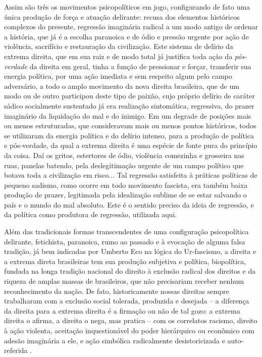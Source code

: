 Assim são três os movimentos psicopolíticos em jogo, configurando de
fato uma única produção de força e atuação delirante: recusa dos
elementos históricos complexos do presente, regressão imaginária radical
a um modo antigo de ordenar a história, que já é a escolha paranoica e
de ódio e pressão urgente por ação de violência, sacrifício e
restauração da civilização. Este sistema de delírio da extrema direita,
que em sua raiz e de modo total já justifica toda ação da
\emph{pós-verdade} da direita em geral, tinha a função de pressionar e
forçar, transferir sua energia política, por uma ação imediata e sem
respeito algum pelo campo adversário, a todo o amplo movimento da nova
direita brasileira, que de um modo ou de outro participou deste tipo de
paixão, cujo próprio delírio de caráter sádico socialmente sustentado já
era realização sintomática, regressiva, do prazer imaginário da
liquidação do mal e do inimigo. Em um degrade de posições mais ou menos
estruturadas, que consideravam mais ou menos pontos históricos, todos se
utilizaram da energia política e do delírio intenso, para a produção de
política e pós-verdade, da qual a extrema direita é uma espécie de fonte
pura do princípio da coisa. Daí os gritos, estertores de ódio, violência
comezinha e grosseira nas ruas, panelas batendo, pela deslegitimação
urgente de um campo político que botava toda a civilização em risco...
Tal regressão satisfeita à práticas políticas de pequeno sadismo, como
ocorre em todo movimento fascista, era também baixa produção de prazer,
legitimada pela idealização sublime de se estar salvando o país e o
mundo do mal absoluto. Este é o sentido preciso da ideia de regressão, e
da política como produtora de regressão, utilizada aqui.

Além das tradicionais formas transcendentes de uma configuração
psicopolítica delirante, fetichista, paranoica, rumo ao passado e à
evocação de alguma falsa tradição, já bem indicadas por Umberto Eco na
lógica do Ur-fascismo, a direita e a extrema direta brasileiras tem sua
produção subjetiva e política, biopolítica, fundada na longa tradição
nacional do direito à exclusão radical dos direitos e da riqueza de
amplas massas de brasileiros, que não precisariam receber nenhum
reconhecimento da nação. De fato, historicamente nossas direitas sempre
trabalharam com a exclusão social tolerada, produzida e desejada -- a
diferença da direita para a extrema direita é a firmação ou não de tal
gozo: a extrema direita o afirma, a direita o nega, mas pratica -- com
os correlatos racismo, direito à ação violenta, aceitação inquestionável
do poder hierárquico ou econômico com adesão imaginária a ele, e ação
simbólica radicalmente desistoricizada e auto-referida .

